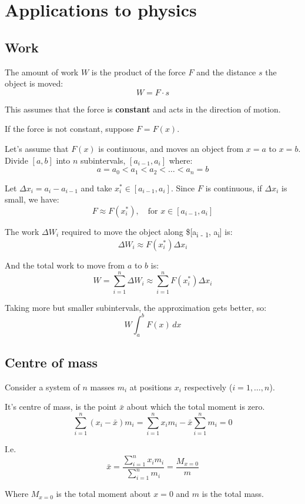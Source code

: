 \documentclass[11pt]{article}
\begin{document}
\newpage
\section{Applications to physics}
\label{sec:orgd8bc409}

\subsection{Work}
\label{sec:org9690f28}
The amount of work \(W\) is the product of the force \(F\) and the distance \(s\) the object is moved:
\[W = F \cdot s\]

This assumes that the force is \textbf{constant} and acts in the direction of motion.


If the force is not constant, suppose \(F = F(x)\).


Let's assume that \(F(x)\) is continuous, and moves an object from \(x = a\) to \(x = b\). Divide \([a, b]\) into \(n\) subintervals, \([a_{i - 1}, a_i]\) where:
\[a = a_0 < a_ 1 < a_2 < \ldots < a_n = b\]

Let \(\Delta x_i = a_i - a_{i - 1}\) and take \(x_i^* \in [a_{i - 1}, a_i]\). Since \(F\) is continuous, if \(\Delta x_i\) is small, we have:
\[F \approx F(x_i^*), \quad \text{for } x \in [a_{i - 1}, a_i]\]

The work \(\Delta W_i\) required to move the object along \$[a\textsubscript{i - 1}, a\textsubscript{i}] is:
\[\Delta W_i \approx F(x_i^*) \Delta x_i\]

And the total work to move from \(a\) to \(b\) is:
\[W = \sum_{i = 1}^n \Delta W_i \approx \sum_{i = 1}^n F(x_i^*) \Delta x_i\]

Taking more but smaller subintervals, the approximation gets better, so:
\[W \int_a^b F(x) \, dx\]

\newpage
\subsection{Centre of mass}
\label{sec:orgecd54d3}
Consider a system of \(n\) masses \(m_i\) at positions \(x_i\) respectively (\(i = 1, \ldots, n\)).


It's centre of mass, is the point \(\bar{x}\) about which the total moment is zero.
\[\sum_{i = 1}^n (x_i - \bar{x})m_i = \sum_{i = 1}^n x_i m_i - \bar{x} \sum_{i = 1}^n m_i = 0\]

I.e.
\[\bar{x} = \frac{\sum_{i = 1}^n x_i m_i}{\sum_{i = 1}^n m_i} = \frac{M_{x = 0}}{m}\]

Where \(M_{x = 0}\) is the total moment about \(x = 0\) and \(m\) is the total mass.
\end{document}
